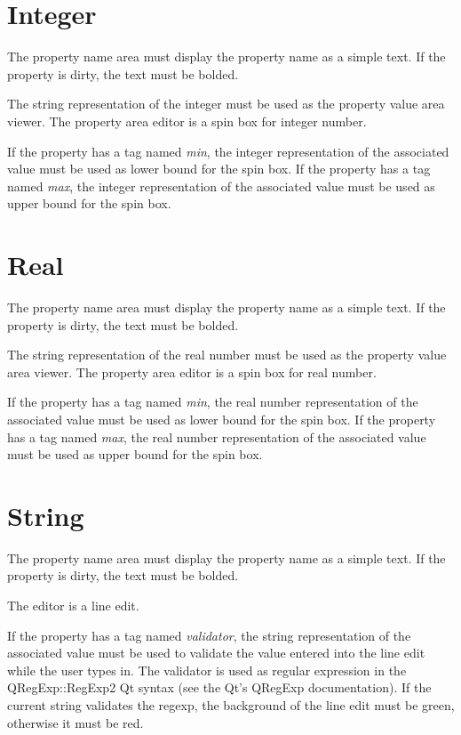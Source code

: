 \documentclass[a4paper, twoside]{report}
\begin{document}
\section{Integer}

The property name area must display the property name as a simple text. If the property is dirty,
the text must be bolded.

The string representation of the integer must be used as the property value area viewer.
The property area editor is a spin box for integer number.

If the property has a tag named \emph{min}, the integer representation of the associated value must
be used as lower bound for the spin box.
If the property has a tag named \emph{max}, the integer representation of the associated value must
be used as upper bound for the spin box.

\section{Real}

The property name area must display the property name as a simple text. If the property is dirty,
the text must be bolded.

The string representation of the real number must be used as the property value area viewer.
The property area editor is a spin box for real number.

If the property has a tag named \emph{min}, the real number representation of the associated value must be used as lower bound for the spin box.
If the property has a tag named \emph{max}, the real number representation of the associated value must be used as upper bound for the spin box.

\section{String}

The property name area must display the property name as a simple text. If the property is dirty,
the text must be bolded.

The editor is a line edit.

If the property has a tag named \emph{validator}, the string representation of the associated value
must be used to validate the value entered into the line edit while the user types in. The validator
is used as regular expression in the QRegExp::RegExp2 Qt syntax (see the Qt's QRegExp
documentation). If the current string validates the regexp, the background of the line edit must be
green, otherwise it must be red.
\end{document}
